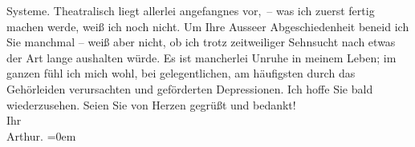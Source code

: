 \begin{ledgroupsized}[t]{13cm}
                  Systeme. Theatralisch liegt
               allerlei angefangnes vor, – was ich zuerst fertig machen werde, weiß ich noch
               nicht.\pend
           \pstart
           Um Ihre Ausseer Abgeschiedenheit beneid ich Sie
               manchmal – weiß aber nicht, ob ich  trotz
               zeitweiliger Sehnsucht nach etwas der Art lange aushalten würde. Es ist mancherlei
               Unruhe in meinem Leben; im ganzen fühl ich mich wohl, bei gelegentlichen, am
               häufigsten durch das Gehörleiden verursachten und geförderten Depressionen.\pend
           \pstart
           Ich hoffe Sie bald wiederzusehen.\pend
           \pstart
           Seien Sie von Herzen gegrüßt und bedankt!{\\[\baselineskip]}Ihr{\\[\baselineskip]}\spacefill\mbox{Arthur.}\pend
           \leftskip=0em{}
         
         \endnumbering{}\end{ledgroupsized}  \newcommand{\dateiname}{L02455}\newcommand{\titel}{Arthur Schnitzler an Hugo Hofmannsthal, 16. 11. 1925}\newcommand{\editorInnen}{Martin Anton Müller und Gerd-Hermann Susen}
      
